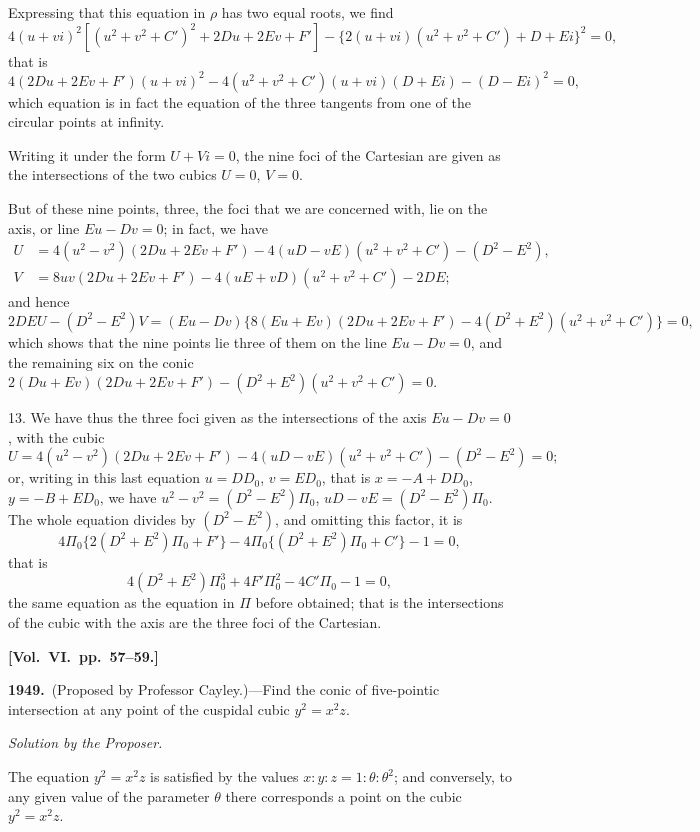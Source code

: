 \documentclass[11pt,a4paper]{article}
\theoremstyle{plain}
\theoremstyle{definition}
\theoremstyle{remark}
\begin{document}
Expressing that this equation in $\rho$ has two equal roots, we find
\[
4(u+vi)^{2}[(u^{2}+v^{2}+C')^{2}+2Du+2Ev+F']-\{2(u+vi)(u^{2}+v^{2}+C')+D+Ei\}^{2}=0,
\]
that is
\[
4(2Du+2Ev+F')(u+vi)^{2}-4(u^{2}+v^{2}+C')(u+vi)(D+Ei)-(D-Ei)^{2}=0,
\]
which equation is in fact the equation of the three tangents from one of the circular points at infinity.

Writing it under the form $U+Vi=0$, the nine foci of the Cartesian are given as the intersections of the two cubics $U=0$, $V=0$.

But of these nine points, three, the foci that we are concerned with, lie on the axis, or line $Eu-Dv=0$; in fact, we have
\begin{align*}
U &= 4(u^{2}-v^{2})(2Du+2Ev+F')-4(uD-vE)(u^{2}+v^{2}+C')-(D^{2}-E^{2}),\\
V &= 8uv(2Du+2Ev+F')-4(uE+vD)(u^{2}+v^{2}+C')-2DE;
\end{align*}
and hence
\[
2DEU-(D^{2}-E^{2})V=(Eu-Dv)\{8(Eu+Ev)(2Du+2Ev+F')-4(D^{2}+E^{2})(u^{2}+v^{2}+C')\}=0,
\]
which shows that the nine points lie three of them on the line $Eu-Dv=0$, and the remaining six on the conic $2(Du+Ev)(2Du+2Ev+F')-(D^{2}+E^{2})(u^{2}+v^{2}+C')=0$.

13. We have thus the three foci given as the intersections of the axis $Eu-Dv=0$, with the cubic
\[
U=4(u^{2}-v^{2})(2Du+2Ev+F')-4(uD-vE)(u^{2}+v^{2}+C')-(D^{2}-E^{2})=0;
\]
or, writing in this last equation $u=DD_{0}$, $v=ED_{0}$, that is $x=-A+DD_{0}$, $y=-B+ED_{0}$, we have $u^{2}-v^{2}=(D^{2}-E^{2})\Pi_{0}$, $uD-vE=(D^{2}-E^{2})\Pi_{0}$. The whole equation divides by $(D^{2}-E^{2})$, and omitting this factor, it is
\[
4\Pi_{0}\{2(D^{2}+E^{2})\Pi_{0}+F'\}-4\Pi_{0}\{(D^{2}+E^{2})\Pi_{0}+C'\}-1=0,
\]
that is
\[
4(D^{2}+E^{2})\Pi_{0}^{3}+4F'\Pi_{0}^{2}-4C'\Pi_{0}-1=0,
\]
the same equation as the equation in $\Pi$ before obtained; that is the intersections of the cubic with the axis are the three foci of the Cartesian.


\textbf{[Vol.\ VI.\ pp.\ 57--59.]}

\textbf{1949.}\ (Proposed by Professor Cayley.)---Find the conic of five-pointic intersection at any point of the cuspidal cubic $y^{2}=x^{2}z$.

\textit{Solution by the Proposer.}

The equation $y^{2}=x^{2}z$ is satisfied by the values $x:y:z=1:\theta:\theta^{2}$; and conversely, to any given value of the parameter $\theta$ there corresponds a point on the cubic $y^{2}=x^{2}z$.
\end{document}
